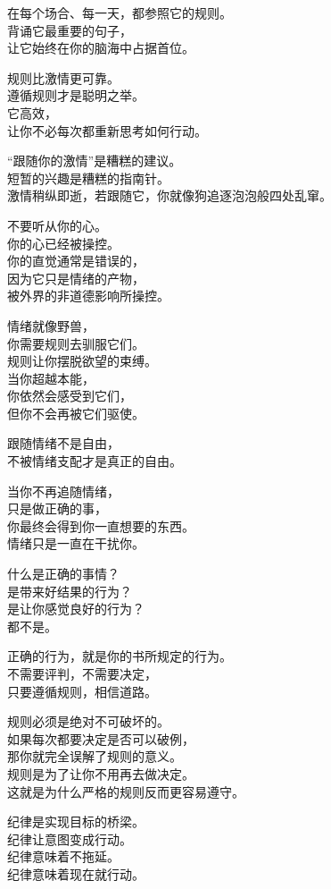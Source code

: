 \documentclass[
]{article}
\begin{document}
在每个场合、每一天，都参照它的规则。\\
背诵它最重要的句子，\\
让它始终在你的脑海中占据首位。

规则比激情更可靠。\\
遵循规则才是聪明之举。\\
它高效，\\
让你不必每次都重新思考如何行动。

``跟随你的激情''是糟糕的建议。\\
短暂的兴趣是糟糕的指南针。\\
激情稍纵即逝，若跟随它，你就像狗追逐泡泡般四处乱窜。

不要听从你的心。\\
你的心已经被操控。\\
你的直觉通常是错误的，\\
因为它只是情绪的产物，\\
被外界的非道德影响所操控。

情绪就像野兽，\\
你需要规则去驯服它们。\\
规则让你摆脱欲望的束缚。\\
当你超越本能，\\
你依然会感受到它们，\\
但你不会再被它们驱使。

跟随情绪不是自由，\\
不被情绪支配才是真正的自由。

当你不再追随情绪，\\
只是做正确的事，\\
你最终会得到你一直想要的东西。\\
情绪只是一直在干扰你。

什么是正确的事情？\\
是带来好结果的行为？\\
是让你感觉良好的行为？\\
都不是。

正确的行为，就是你的书所规定的行为。\\
不需要评判，不需要决定，\\
只要遵循规则，相信道路。

规则必须是绝对不可破坏的。\\
如果每次都要决定是否可以破例，\\
那你就完全误解了规则的意义。\\
规则是为了让你不用再去做决定。\\
这就是为什么严格的规则反而更容易遵守。

纪律是实现目标的桥梁。\\
纪律让意图变成行动。\\
纪律意味着不拖延。\\
纪律意味着现在就行动。
\end{document}
